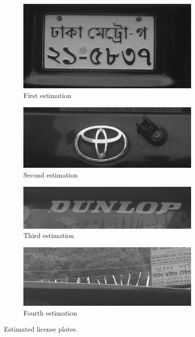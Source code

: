 \documentclass{standalone}
\begin{document}
\begin{figure}
\begin{subfigure}{.5\textwidth}
  \centering
  \includegraphics[width=.8\linewidth]{./img/sample/stage6-1.jpg}
  \caption{First estimation}
  \label{fig:FirstExtracted}
\end{subfigure}
\begin{subfigure}{.5\textwidth}
  \centering
  \includegraphics[width=.8\linewidth]{./img/sample/stage6-2.jpg}
  \caption{Second estimation}
  \label{fig:SecondExtracted}
\end{subfigure}
\begin{subfigure}{.5\textwidth}
  \centering
  \includegraphics[width=.8\linewidth]{./img/sample/stage6-3.jpg}
  \caption{Third estimation}
  \label{fig:ThirdExtracted}
\end{subfigure}
\begin{subfigure}{.5\textwidth}
  \centering
  \includegraphics[width=.8\linewidth]{./img/sample/stage6-4.jpg}
  \caption{Fourth estimation}
  \label{fig:FourthExtracted}
\end{subfigure}
\caption{Estimated license plates.}
\label{fig:ExtractedPlates}
\end{figure}
\end{document}
